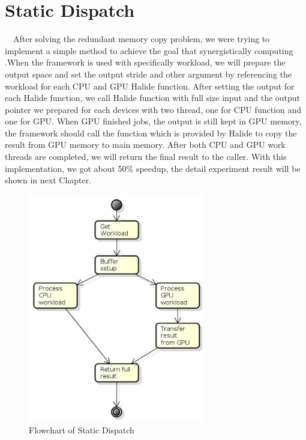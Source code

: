 \section{Static Dispatch}
\quad\ \ After solving the redundant memory copy problem, we were trying to implement a simple method to achieve the goal that synergistically computing .When the framework is used with specifically workload, we will prepare the output space and set the output stride and other argument by referencing the workload for each CPU and GPU Halide function.  After setting the output for each Halide function, we call Halide function with full size input and the output pointer we prepared for each devices with two thread, one for CPU function and one for GPU. When GPU finished jobs, the output is still kept in GPU memory, the framework should call the function which is provided by Halide to copy the result from GPU memory to main memory. After both CPU and GPU work threads are completed, we will return the final result to the caller. With this implementation, we got about 50\% speedup, the detail experiment result will be shown in next Chapter.


\begin{figure}[hbtp]
\centering
\includegraphics[height=10cm]{img/StaticDispatch.png}
\caption{Flowchart of Static Dispatch}
\label{fig:my_label}
\end{figure}


